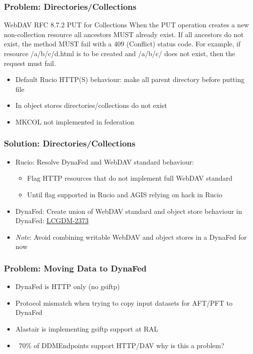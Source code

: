 \documentclass{beamer}
\begin{document}
\begin{frame}
  \frametitle{Problem: Directories/Collections}
  \begin{block}{WebDAV RFC 8.7.2 PUT for Collections}
    When the PUT operation creates a new non-collection resource all ancestors MUST already exist. If all ancestors do not exist, the method MUST fail with a 409 (Conflict) status code. For example, if resource /a/b/c/d.html is to be created and /a/b/c/ does not exist, then the request must fail.
  \end{block}
  \begin{itemize}
    \item<1- > Default Rucio HTTP(S) behaviour: make all parent directory before putting file
    \item<2- > In object stores directories/collections do not exist
    \item<2- > MKCOL not implemented in federation
  \end{itemize}
\end{frame}

\begin{frame}
  \frametitle{Solution: Directories/Collections}
  \begin{itemize}
    \item Rucio: Resolve DynaFed and WebDAV standard behaviour:
    \begin{itemize}
      \item Flag HTTP resources that do not implement full WebDAV standard
      \item Until flag supported in Rucio and AGIS relying on hack in Rucio
    \end{itemize}
    \item DynaFed: Create union of WebDAV standard and object store behaviour in DynaFed: \href{https://its.cern.ch/jira/browse/LCGDM-2373}{LCGDM-2373}
    \item \emph{Note}: Avoid combining writable WebDAV and object stores in a DynaFed for now
  \end{itemize}
\end{frame}

\begin{frame}
  \frametitle{Problem: Moving Data to DynaFed}
  \begin{itemize}
    \item DynaFed is HTTP only (no gsiftp)
    \item Protocol mismatch when trying to copy input datasets for AFT/PFT to DynaFed
    \item Alastair is implementing gsiftp support at RAL
    \item ~70\% of DDMEndpoints support HTTP/DAV why is this a problem?
  \end{itemize}
\end{frame}
\end{document}
